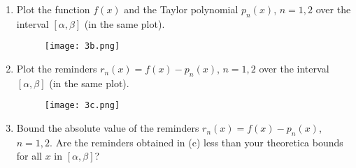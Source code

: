 \documentclass[11pt]{article}
\begin{document}
\begin{enumerate}
\begin{enumerate}
  \item Plot the function $f(x)$ and the Taylor polynomial $p_n(x)$,
    $n = 1, 2$ over the interval $[\alpha, \beta]$ (in the same
    plot).

    \begin{figure}[h]
    \centering
    \texttt{[image: 3b.png]} 
    \end{figure}

  \item Plot the reminders $r_n(x) = f(x) - p_n(x)$, $n = 1, 2$
    over the interval $[\alpha, \beta]$ (in the same plot).

    \begin{figure}[h]
    \centering
    \texttt{[image: 3c.png]} 
    \end{figure}
    
  \item Bound the absolute value of the reminders $r_n(x) = f(x) -
    p_n(x)$, $n = 1, 2$. Are the reminders obtained in (c) less
    than your theoretica bounds for all $x$ in $[\alpha, \beta]$?


\end{enumerate}
\end{enumerate}
\end{document}
